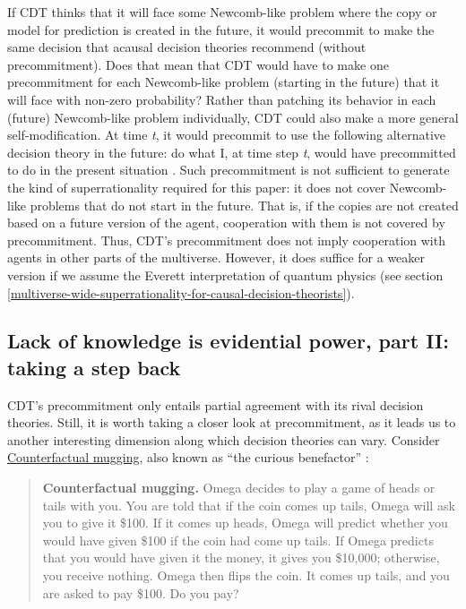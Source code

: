 If CDT thinks that it will face some Newcomb-like problem where the copy
or model for prediction is created in the future, it would precommit to
make the same decision that acausal decision theories recommend (without
precommitment). Does that mean that CDT would have to make one
precommitment for each Newcomb-like problem (starting in the future)
that it will face with non-zero probability? Rather than patching its
behavior in each (future) Newcomb-like problem individually, CDT could
also make a more general self-modification. At time \emph{t}, it would
precommit to use the following alternative decision theory in the
future: do what I, at time step \emph{t}, would have precommitted to do
in the present situation
\parencite{Yudkowsky2010-ky,Soares2015-is,Meacham2010-pk}.
Such precommitment is not sufficient to generate the kind of
superrationality required for this paper: it does not cover Newcomb-like
problems that do not start in the future. That is, if the copies are not
created based on a future version of the agent, cooperation with them is
not covered by precommitment. Thus, CDT's precommitment does not imply
cooperation with agents in other parts of the multiverse. However, it
does suffice for a weaker version if we assume the Everett
interpretation of quantum physics (see section
\ref{multiverse-wide-superrationality-for-causal-decision-theorists}).

\hypertarget{lack-of-knowledge-is-evidential-power-part-ii-taking-a-step-back}{\subsection{Lack
of knowledge is evidential power, part II: taking a step
back}\label{lack-of-knowledge-is-evidential-power-part-ii-taking-a-step-back}}

CDT's precommitment only entails partial agreement with its rival
decision theories. Still, it is worth taking a closer look at
precommitment, as it leads us to another interesting dimension along
which decision theories can vary. Consider
\href{https://wiki.lesswrong.com/wiki/Counterfactual_mugging}{Counterfactual
mugging}, also known as ``the curious benefactor''
\parencite{Hintze2014-xs}:

\begin{quote}
\textbf{Counterfactual mugging.} Omega decides to play a game of heads
or tails with you. You are told that if the coin comes up tails, Omega
will ask you to give it \$100. If it comes up heads, Omega will predict
whether you would have given \$100 if the coin had come up tails. If
Omega predicts that you would have given it the money, it gives you
\$10,000; otherwise, you receive nothing. Omega then flips the coin. It
comes up tails, and you are asked to pay \$100. Do you pay?
\end{quote}

